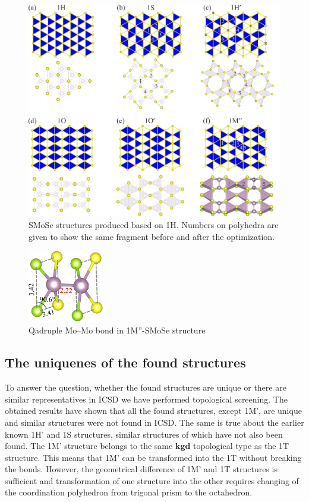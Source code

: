 \documentclass[a4paperm]{article}
\begin{document}
\begin{figure}[H] \centering
        \includegraphics[width=\textwidth]{H-based.png}
        \caption{SMoSe structures produced based on 1H. Numbers on polyhedra are given to show the same fragment before and after the optimization.}
\label{H-based}
\end{figure}

\begin{figure}[H]
	\includegraphics[width=0.3\textwidth]{test3_momo.png}
	\caption{Qadruple Mo--Mo bond in 1M''-SMoSe structure}
\label{test3_momo}
\end{figure}




\subsection{The uniquenes of the found structures}

To answer the question, whether the found structures are unique or there are similar representatives in ICSD we have performed topological screening.
The obtained results have shown that all the found structures, except 1M', are unique and similar structures were not found in ICSD.
The same is true about the earlier known 1H' and 1S structures, similar structures of which have not also been found. 
The 1M' structure belongs to the same {\bf kgd} topological type as the 1T structure.
This means that 1M' can be transformed into the 1T without breaking the bonds.
However, the geometrical difference of 1M' and 1T structures is sufficient and transformation of one structure into the other requires changing of the coordination polyhedron from trigonal prism to the octahedron.
\end{document}
